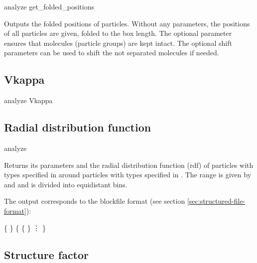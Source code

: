 \begin{essyntax}
  analyze get_folded_positions  
\end{essyntax}

Outputs the folded positions of particles. Without any parameters, the
positions of all particles are given, folded to the box length. The
optional parameter  ensures that molecules
(particle groups) are kept intact. The optional shift parameters can
be used to shift the not separated molecules if needed.

\subsection{Vkappa}
\label{analyze:Vkappa}

\begin{essyntax}
  analyze Vkappa 
\end{essyntax}


\subsection{Radial distribution function}
\label{analyze:rdf}
\label{analyze:<rdf>}

\begin{essyntax}
  analyze  
    
\end{essyntax}
Returns its parameters and the radial distribution function (rdf) of
particles with types specified in  around
particles with types specified in . The range
is given by  and  and is divided into
 equidistant bins.


The output corresponds to the blockfile format (see section
\vref{sec:structured-file-format}):
\begin{code}
\{  \} 
\{ 
  \{   \} 
  \vdots
\}
\end{code}

\subsection{Structure factor}
\label{analyze:structurefactor}

